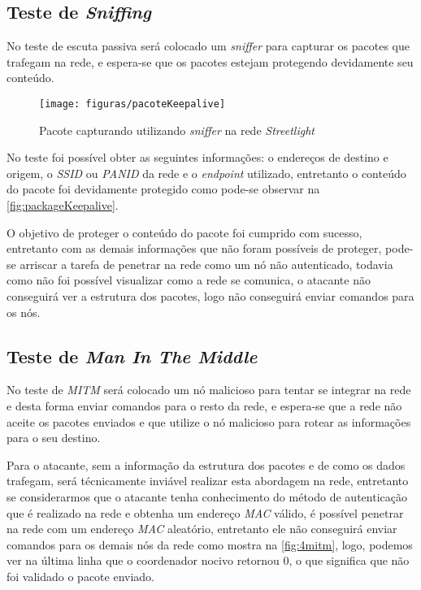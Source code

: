 \subsection{Teste de \emph{Sniffing}}
\par No teste de escuta passiva ser\'a colocado um \emph{sniffer} para capturar os pacotes que trafegam na rede, e espera-se que os pacotes estejam protegendo devidamente seu conte\'udo.

\begin{figure}[ht]
    \centering
    \caption{Pacote capturando utilizando \emph{sniffer} na rede \emph{Streetlight}}
    \texttt{[image: figuras/pacoteKeepalive]}
    \label{fig:packageKeepalive}
\end{figure} 

\par No teste foi poss\'ivel obter as seguintes informa\c{c}\~oes: o endere\c{c}os de destino e origem, o \emph{SSID} ou \emph{PANID} da rede e o \emph{endpoint} utilizado, entretanto o conte\'udo do pacote foi devidamente protegido como pode-se observar na \autoref{fig:packageKeepalive}.

\par O objetivo de proteger o conte\'udo do pacote foi cumprido com sucesso, entretanto com as demais informa\c{c}\~oes que n\~ao foram poss\'iveis de proteger, pode-se arriscar a tarefa de penetrar na rede como um n\'o n\~ao autenticado, todavia como n\~ao foi poss\'ivel visualizar como a rede se comunica, o atacante n\~ao conseguir\'a ver a estrutura dos pacotes, logo n\~ao conseguir\'a enviar comandos para os n\'os.

\subsection{Teste de \emph{Man In The Middle}}
\par No teste de \emph{MITM} ser\'a colocado um n\'o malicioso para tentar se integrar na rede e desta forma enviar comandos para o resto da rede, e espera-se que a rede n\~ao aceite os pacotes enviados e que utilize o n\'o malicioso para rotear as informa\c{c}\~oes para o seu destino.

\par Para o atacante, sem a informa\c{c}\~ao da estrutura dos pacotes e de como os dados trafegam, ser\'a t\'ecnicamente invi\'avel realizar esta abordagem na rede, entretanto se considerarmos que o atacante tenha conhecimento do m\'etodo de autentica\c{c}\~ao que \'e realizado na rede e obtenha um endere\c{c}o \emph{MAC} v\'alido, \'e poss\'ivel penetrar na rede com um endere\c{c}o \emph{MAC} aleat\'orio, entretanto ele n\~ao conseguir\'a enviar comandos para os demais n\'os da rede como mostra na \autoref{fig:4mitm}, logo, podemos ver na \'ultima linha que o coordenador nocivo retornou 0, o que significa que n\~ao foi validado o pacote enviado.

